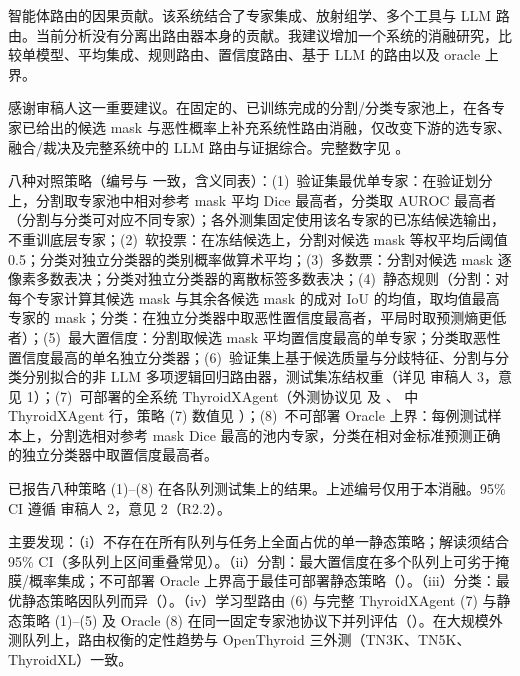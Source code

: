 \begin{reviewercomment}
智能体路由的因果贡献。该系统结合了专家集成、放射组学、多个工具与 LLM 路由。当前分析没有分离出路由器本身的贡献。我建议增加一个系统的消融研究，比较单模型、平均集成、规则路由、置信度路由、基于 LLM 的路由以及 oracle 上界。
\end{reviewercomment}
\begin{authorresponse}
感谢审稿人这一重要建议。在固定的、已训练完成的分割/分类专家池上，在各专家已给出的候选 mask 与恶性概率上补充系统性路由消融，仅改变下游的选专家、融合/裁决及完整系统中的 LLM 路由与证据综合。完整数字见 。\par
八种对照策略（编号与  一致，含义同表）：(1)~验证集最优单专家：在验证划分上，分割取专家池中相对参考 mask 平均 Dice 最高者，分类取 AUROC 最高者（分割与分类可对应不同专家）；各外测集固定使用该名专家的已冻结候选输出，不重训底层专家；(2)~软投票：在冻结候选上，分割对候选 mask 等权平均后阈值 0.5；分类对独立分类器的类别概率做算术平均；(3)~多数票：分割对候选 mask 逐像素多数表决；分类对独立分类器的离散标签多数表决；(4)~静态规则（分割：对每个专家计算其候选 mask 与其余各候选 mask 的成对 IoU 的均值，取均值最高专家的 mask；分类：在独立分类器中取恶性置信度最高者，平局时取预测熵更低者）；(5)~最大置信度：分割取候选 mask 平均置信度最高的单专家；分类取恶性置信度最高的单名独立分类器；(6)~验证集上基于候选质量与分歧特征、分割与分类分别拟合的非 LLM 多项逻辑回归路由器，测试集冻结权重（详见 审稿人 3，意见 1）；(7)~可部署的全系统 ThyroidXAgent（外测协议见  及 、 中 ThyroidXAgent 行，策略 (7) 数值见 ）；(8)~不可部署 Oracle 上界：每例测试样本上，分割选相对参考 mask Dice 最高的池内专家，分类在相对金标准预测正确的独立分类器中取置信度最高者。\par
{} 已报告八种策略 (1)--(8) 在各队列测试集上的结果。上述编号仅用于本消融。95\% CI 遵循 审稿人 2，意见 2（R2.2）。\par
主要发现：（i）不存在在所有队列与任务上全面占优的单一静态策略；解读须结合 95\% CI（多队列上区间重叠常见）。（ii）分割：最大置信度在多个队列上可劣于掩膜/概率集成；不可部署 Oracle 上界高于最佳可部署静态策略（）。（iii）分类：最优静态策略因队列而异（）。（iv）学习型路由 (6) 与完整 ThyroidXAgent (7) 与静态策略 (1)--(5) 及 Oracle (8) 在同一固定专家池协议下并列评估（）。在大规模外测队列上，路由权衡的定性趋势与 OpenThyroid 三外测（TN3K、TN5K、ThyroidXL）一致。\par
\par
\end{authorresponse}

